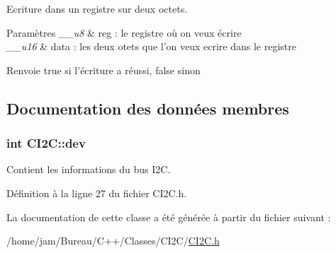 Ecriture dans un registre sur deux octets. 


\begin{DoxyParams}{Paramètres}
{\em \+\_\+\+\_\+u8} & reg \+: le registre où on veux écrire \\
\hline
{\em \+\_\+\+\_\+u16} & data \+: les deux otets que l'on veux ecrire dans le registre \\
\hline
\end{DoxyParams}
\begin{DoxyReturn}{Renvoie}
true si l'écriture a réussi, false sinon 
\end{DoxyReturn}


\subsection{Documentation des données membres}
\hypertarget{class_c_i2_c_ae2d4648eadc2acae86a49cecbf39ce56}{
\subsubsection[{dev}]{\setlength{\rightskip}{0pt plus 5cm}int C\+I2\+C\+::dev\hspace{0.3cm}{\ttfamily [private]}}}\label{class_c_i2_c_ae2d4648eadc2acae86a49cecbf39ce56}


Contient les informations du bus I2\+C. 



Définition à la ligne 27 du fichier C\+I2\+C.\+h.



La documentation de cette classe a été générée à partir du fichier suivant \+:\begin{DoxyCompactItemize}
\item 
/home/jam/\+Bureau/\+C++/\+Classes/\+C\+I2\+C/\hyperlink{_c_i2_c_8h}{C\+I2\+C.\+h}\end{DoxyCompactItemize}
